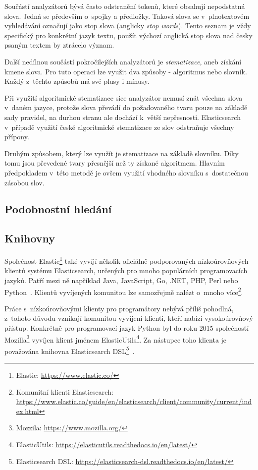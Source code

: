 Součástí analyzátorů bývá často odstranění tokenů, které obsahují nepodstatná slova. Jedná se především o~spojky a předložky. Taková slova se v~plnotextovém vyhledávání označují jako {stop slova} (anglicky \emph{stop words}). Tento seznam je vždy specifický pro konkrétní jazyk textu, použít výchozí anglická stop slova nad česky psaným textem by ztrácelo význam.

Další nedílnou součástí pokročilejších analyzátorů je \emph{stematizace}, aneb získání kmene slova. Pro tuto operaci lze využit dva způsoby - algoritmus nebo slovník. Každý z~těchto způsobů má své plusy i mínusy.

Při využití algoritmické stematizace sice analyzátor nemusí znát všechna slova v~daném jazyce, protože slova převádí do požadovaného tvaru pouze na základě sady pravidel, na durhou stranu ale dochází k~větší nepřesnosti. Elasticsearch v~případě využití české algoritmické stematizace ze slov odstraňuje všechny přípony.

Druhým způsobem, který lze využít je stematizace na základě slovníku. Díky tomu jsou převedené tvary přesnější než ty získané algoritmem. Hlavním předpokladem v~této metodě je ovšem využití vhodného slovníku s~dostatečnou zásobou slov.

\subsection{Podobnostní hledání}
\blindtext[2]

\subsection{Knihovny}
Společnost Elastic\footnote{Elastic: \url{https://www.elastic.co/}} také vyvíjí několik oficiálně podporovaných nízkoúrovňových klientů systému Elasticsearch, určených pro mnoho populárních programovacích jazyků. Patří mezi ně například Java, JavaScript, Go, .NET, PHP, Perl nebo Python~\cite{bib:elastic-clients}.
Klientů vyvíjených komunitou lze samozřejmě nalézt o~mnoho více\footnote{Komunitní klienti Elasticsearch: \url{https://www.elastic.co/guide/en/elasticsearch/client/community/current/index.html}}.

Práce s~nízkoúrovňovými klienty pro programátory nebývá příliš pohodlná, z~tohoto důvodu vznikají komunitou vyvíjení klienti, kteří nabízí vysokoúrovňový přístup. Konkrétně pro programovací jazyk Python byl do roku 2015 společností Mozilla\footnote{Mozzila: \url{https://www.mozilla.org/}} vyvíjen klient jménem ElasticUtils\footnote{ElasticUtils: \url{https://elasticutils.readthedocs.io/en/latest/}}. Za nástupce toho klienta je považována knihovna Elasticsearch DSL\footnote{Elasticsearch DSL: \url{https://elasticsearch-dsl.readthedocs.io/en/latest/}}~\cite{bib:elastic-utils}.

